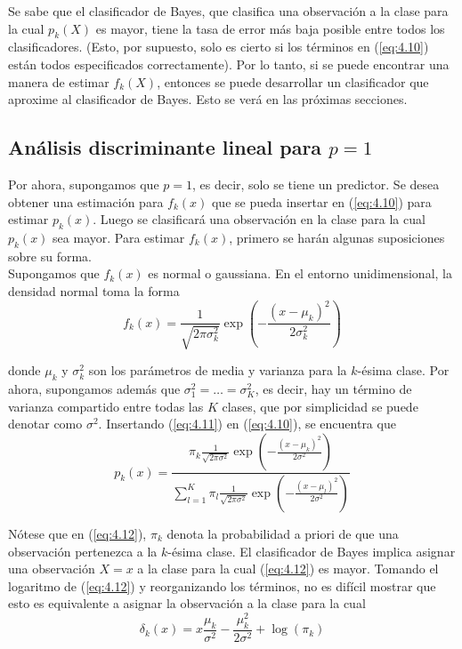 Se sabe que el clasificador de Bayes, que clasifica una observación a la clase para la cual $p_k(X)$ es mayor, tiene la tasa de error más baja posible entre todos los clasificadores. (Esto, por supuesto, solo es cierto si los términos en (\ref{eq:4.10}) están todos especificados correctamente). Por lo tanto, si se puede encontrar una manera de estimar $f_k(X)$, entonces se puede desarrollar un clasificador que aproxime al clasificador de Bayes. Esto se verá en las próximas secciones.

\subsection{Análisis discriminante lineal para $p = 1$}

Por ahora, supongamos que $p = 1$, es decir, solo se tiene un predictor. Se desea obtener una estimación para $f_k(x)$ que se pueda insertar en (\ref{eq:4.10}) para estimar $p_k(x)$. Luego se clasificará una observación en la clase para la cual $p_k(x)$ sea mayor. Para estimar $f_k(x)$, primero se harán algunas suposiciones sobre su forma. \\

Supongamos que $f_k(x)$ es normal o gaussiana. En el entorno unidimensional, la densidad normal toma la forma
\begin{equation}
f_k(x) = \frac{1}{\sqrt{2\pi\sigma^2_k}} \exp\left(-\frac{(x - \mu_k)^2}{2\sigma^2_k}\right)
\label{eq:4.11}
\end{equation}

donde $\mu_k$ y $\sigma^2_k$ son los parámetros de media y varianza para la $k$-ésima clase. Por ahora, supongamos además que $\sigma^2_1 = \ldots = \sigma^2_K$, es decir, hay un término de varianza compartido entre todas las $K$ clases, que por simplicidad se puede denotar como $\sigma^2$. Insertando (\ref{eq:4.11}) en (\ref{eq:4.10}), se encuentra que
\begin{equation}
p_k(x) = \frac{\pi_k \frac{1}{\sqrt{2\pi\sigma^2}} \exp\left(-\frac{(x - \mu_k)^2}{2\sigma^2}\right)}{\sum_{l=1}^K \pi_l \frac{1}{\sqrt{2\pi\sigma^2}} \exp\left(-\frac{(x - \mu_l)^2}{2\sigma^2}\right)}
\label{eq:4.12}
\end{equation}

Nótese que en (\ref{eq:4.12}), $\pi_k$ denota la probabilidad a priori de que una observación pertenezca a la $k$-ésima clase. El clasificador de Bayes implica asignar una observación $X = x$ a la clase para la cual (\ref{eq:4.12}) es mayor. Tomando el logaritmo de (\ref{eq:4.12}) y reorganizando los términos, no es difícil mostrar que esto es equivalente a asignar la observación a la clase para la cual
\begin{equation}
\delta_k(x) = x \frac{\mu_k}{\sigma^2} - \frac{\mu_k^2}{2\sigma^2} + \log(\pi_k)
\label{eq:4.13}
\end{equation}

